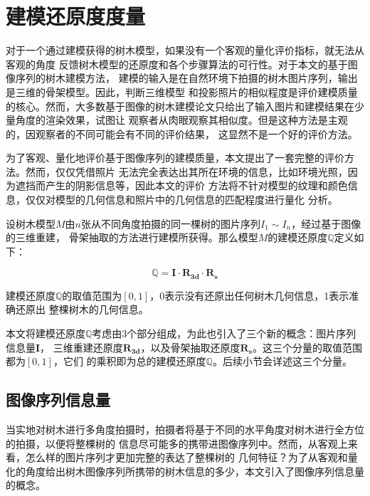 
\chapter{建模还原度度量}
\label{sec:qualityevaluation}
对于一个通过建模获得的树木模型，如果没有一个客观的量化评价指标，就无法从客观的角度
反馈树木模型的还原度和各个步骤算法的可行性。对于本文的基于图像序列的树木建模方法，
建模的输入是在自然环境下拍摄的树木图片序列，输出是三维的骨架模型。因此，判断三维模型
和投影照片的相似程度是评价建模质量的核心。然而，大多数基于图像的树木建模论文\cite{quanlong,
tanping,lichuan,tanping2,liu}只给出了输入图片和建模结果在少量角度的渲染效果，试图让
观察者从肉眼观察其相似度。但是这种方法是主观的，因观察者的不同可能会有不同的评价结果，
这显然不是一个好的评价方法。

为了客观、量化地评价基于图像序列的建模质量，本文提出了一套完整的评价方法。然而，仅仅凭借照片
无法完全表达出其所在环境的信息，比如环境光照，因为遮挡而产生的阴影信息等，因此本文的评价
方法将不针对模型的纹理和颜色信息，仅仅对模型的几何信息和照片中的几何信息的匹配程度进行量化
分析。

设树木模型$M$由$n$张从不同角度拍摄的同一棵树的图片序列$I_1\sim I_n$，经过基于图像的三维重建，
骨架抽取的方法进行建模所获得。那么模型$M$的建模还原度$\mathbb{Q}$定义如下：\\
\begin{definition}
	\[\mathbb{Q}=\mathbf{I}\cdot\mathbf{R_{3d}}\cdot\mathbf{R_s}\]
\end{definition}

建模还原度$\mathbb{Q}$的取值范围为$[0,1]$，0表示没有还原出任何树木几何信息，1表示准确还原出
整棵树木的几何信息。

本文将建模还原度$\mathbb{Q}$考虑由3个部分组成，为此也引入了三个新的概念：图片序列信息量$\mathbf{I}$，
三维重建还原度$\mathbf{R_{3d}}$，以及骨架抽取还原度$\mathbf{R_s}$。这三个分量的取值范围都为$[0,1]$，它们
的乘积即为总的建模还原度$\mathbb{Q}$。后续小节会详述这三个分量。

\section{图像序列信息量}
当实地对树木进行多角度拍摄时，拍摄者将基于不同的水平角度对树木进行全方位的拍摄，以便将整棵树的
信息尽可能多的携带进图像序列中。然而，从客观上来看，怎么样的图片序列才更加完整的表达了整棵树的
几何特征？为了从客观和量化的角度给出树木图像序列所携带的树木信息的多少，本文引入了图像序列信息量的概念。

